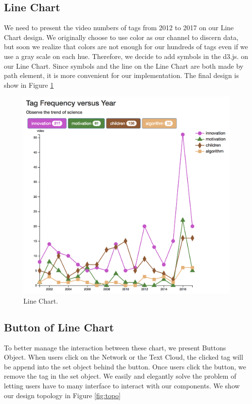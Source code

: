 \documentclass{report}
\numberwithin{figure}{section}
\begin{document}
\subsection{Line Chart}
\quad  We need to present the video numbers of tags from 2012 to 2017 on our Line Chart design. We originally choose to use color as our channel to discern data, but soon we realize that colors are not enough for our hundreds of tags even if we use a gray scale on each hue. Therefore, we decide to add symbols\cite{d3.symbol} in the d3.js. on our Line Chart. Since symbols and the line on the Line Chart are both made by path element, it is more convenient for our implementation. The final design is show in Figure \ref{fig:linechart}

\begin{figure}
\begin{center}
\includegraphics[scale=0.4]{linechart}
\caption{Line Chart.}
\label{fig:linechart}
\end{center}
\end{figure}



\subsection{Button of Line Chart}
\quad To better manage the interaction between these chart, we present Buttons Object. When users click on the Network or the Text Cloud, the clicked tag will be append into the set object behind the button. Once users click the button, we remove the tag in the set object. We easily and elegantly solve the problem of letting users have to many interface to interact with our components. We show our design topology in Figure \ref{fig:topo}
\end{document}
